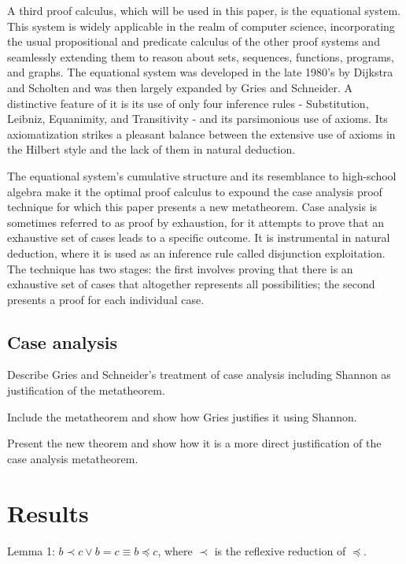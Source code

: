 \documentclass[12pt, fleqn, leqno]{article}
\begin{document}
A third proof calculus, which will be used in this paper, is the equational system. This system is widely applicable in the realm of computer science, incorporating the usual propositional and predicate calculus of the other proof systems and seamlessly extending them to reason about sets, sequences, functions, programs, and graphs. The equational system was developed in the late 1980’s by Dijkstra and Scholten and was then largely expanded by Gries and Schneider. A distinctive feature of it is its use of only four inference rules - Substitution, Leibniz, Equanimity, and Transitivity - and its parsimonious use of axioms. Its axiomatization strikes a pleasant balance between the extensive use of axioms in the Hilbert style and the lack of them in natural deduction.

The equational system’s cumulative structure and its resemblance to high-school algebra make it the optimal proof calculus to expound the case analysis proof technique for which this paper presents a new metatheorem. Case analysis is sometimes referred to as proof by exhaustion, for it attempts to prove that an exhaustive set of cases leads to a specific outcome. It is instrumental in natural deduction, where it is used as an inference rule called disjunction exploitation. The technique has two stages: the first involves proving that there is an exhaustive set of cases that altogether represents all possibilities; the second presents a proof for each individual case.

\subsection{Case analysis}

Describe Gries and Schneider's treatment of case analysis including Shannon as justification of the metatheorem.

Include the metatheorem and show how Gries justifies it using Shannon. 

Present the new theorem and show how it is a more direct justification of the case analysis metatheorem.

\section{Results}

Lemma 1: $b \prec c \lor b = c \equiv b \preceq c$, where $\prec$ is the reflexive reduction of $\preceq$.
\end{document}
